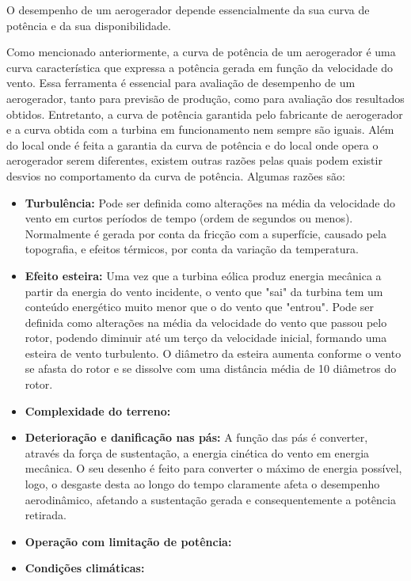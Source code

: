 O desempenho de um aerogerador depende essencialmente da sua curva de potência e da sua disponibilidade. 

Como mencionado anteriormente, a curva de potência de um aerogerador é uma curva característica que expressa a potência gerada em função da velocidade do vento. Essa ferramenta é essencial para avaliação de desempenho de um aerogerador, tanto para previsão de produção, como para avaliação dos resultados obtidos. Entretanto, a curva de potência garantida pelo fabricante de aerogerador e a curva obtida com a turbina em funcionamento nem sempre são iguais. Além do local onde é feita a garantia da curva de potência e do local onde opera o aerogerador serem diferentes, existem outras razões pelas quais podem existir desvios no comportamento da curva de potência. Algumas razões são:

\begin{itemize}
  \item \textbf{Turbulência:} Pode ser definida como alterações na média da velocidade do vento em curtos períodos de tempo (ordem de segundos ou menos). Normalmente é gerada por conta da fricção com a superfície, causado pela topografia, e efeitos térmicos, por conta da variação da temperatura.
  \item \textbf{Efeito esteira:} Uma vez que a turbina eólica produz energia mecânica a partir da energia do vento incidente, o vento que "sai" da turbina tem um conteúdo energético muito menor que o do vento que "entrou". Pode ser definida como alterações na média da velocidade do vento que passou pelo rotor, podendo diminuir até um terço da velocidade inicial, formando uma esteira de vento turbulento. O diâmetro da esteira aumenta conforme o vento se afasta do rotor e se dissolve com uma distância média de 10 diâmetros do rotor.
  \item \textbf{Complexidade do terreno:}
  \item \textbf{Deterioração e danificação nas pás:} A função das pás é converter, através da força de sustentação, a energia cinética do vento em energia mecânica. O seu desenho é feito para converter o máximo de energia possível, logo, o desgaste desta ao longo do tempo claramente afeta o desempenho aerodinâmico, afetando a sustentação gerada e consequentemente a potência retirada.
  \item \textbf{Operação com limitação de potência:}
  \item \textbf{Condições climáticas:}
\end{itemize}

